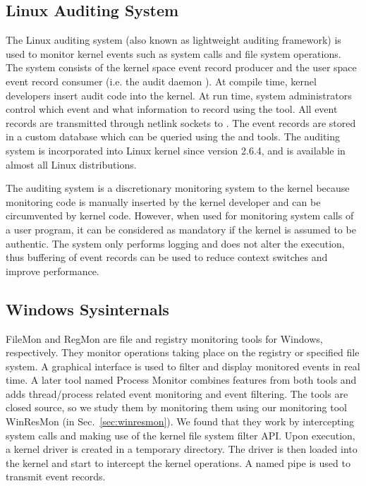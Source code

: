 \subsection{Linux Auditing System}
\label{sec:laudit}

The Linux auditing system (also known as lightweight auditing framework)
is used to monitor kernel events such as system calls and file system
operations.
The system consists of the kernel space event record producer and
the user space event record consumer (i.e. the audit daemon ).
At compile time,
kernel developers insert audit code into the kernel.
At run time, system administrators control which event and what information
to record using the  tool.
All event records are transmitted through netlink sockets to .
The event records are stored in a custom database which can be queried
using the  and  tools.
The auditing system is incorporated into Linux kernel since version 2.6.4,
and is available in almost all Linux distributions.

The auditing system is a discretionary monitoring system to the kernel because
monitoring code is manually inserted by the kernel developer and can
be circumvented by kernel code.
However, when used for monitoring system calls of a user program,
it can be considered as mandatory if the kernel is assumed to be authentic.
The system only performs logging and does not alter the execution,
thus buffering of event records can be used to reduce context switches
and improve performance.

\subsection{Windows Sysinternals}
\label{sec:sysinternals}

FileMon \cite{filemon} and RegMon \cite{regmon}
are file and registry monitoring tools for Windows, respectively.
They monitor operations taking place on
the registry or specified file system.
A graphical interface is used to filter and display monitored events in real time.
A later tool named Process Monitor combines features from both tools
and adds thread/process related event monitoring and event filtering.
The tools are closed source, so we study them by monitoring them
using our monitoring tool WinResMon (in Sec.~\ref{sec:winresmon}).
We found that they work by intercepting system calls and making
use of the kernel file system filter API.
Upon execution, a kernel driver is created in a temporary directory.
The driver is then loaded into the kernel and start to intercept
the kernel operations.
A named pipe is used to transmit event records.

